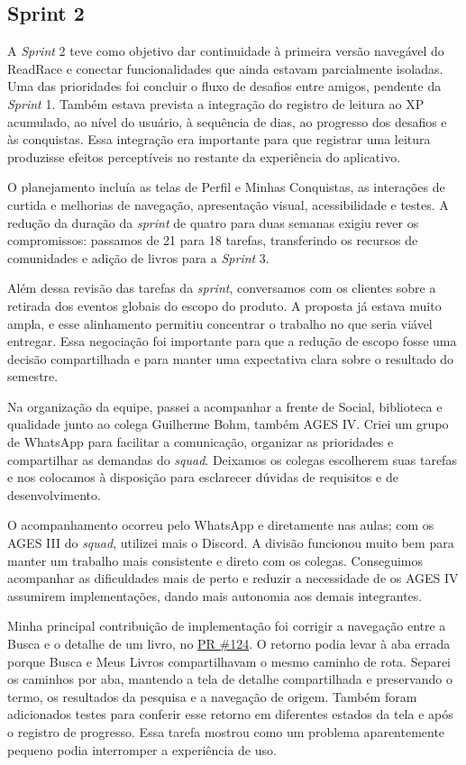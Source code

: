 \clearpage
\subsection{Sprint 2}

A \textit{Sprint} 2 teve como objetivo dar continuidade à primeira versão navegável do ReadRace e conectar funcionalidades que ainda estavam parcialmente isoladas. Uma das prioridades foi concluir o fluxo de desafios entre amigos, pendente da \textit{Sprint} 1. Também estava prevista a integração do registro de leitura ao \ac{XP} acumulado, ao nível do usuário, à sequência de dias, ao progresso dos desafios e às conquistas. Essa integração era importante para que registrar uma leitura produzisse efeitos perceptíveis no restante da experiência do aplicativo.

O planejamento incluía as telas de Perfil e Minhas Conquistas, as interações de curtida e melhorias de navegação, apresentação visual, acessibilidade e testes. A redução da duração da \textit{sprint} de quatro para duas semanas exigiu rever os compromissos: passamos de 21 para 18 tarefas, transferindo os recursos de comunidades e adição de livros para a \textit{Sprint} 3.

Além dessa revisão das tarefas da \textit{sprint}, conversamos com os clientes sobre a retirada dos eventos globais do escopo do produto. A proposta já estava muito ampla, e esse alinhamento permitiu concentrar o trabalho no que seria viável entregar. Essa negociação foi importante para que a redução de escopo fosse uma decisão compartilhada e para manter uma expectativa clara sobre o resultado do semestre.

Na organização da equipe, passei a acompanhar a frente de Social, biblioteca e qualidade junto ao colega Guilherme Bohm, também \ac{AGES} IV. Criei um grupo de WhatsApp para facilitar a comunicação, organizar as prioridades e compartilhar as demandas do \textit{squad}. Deixamos os colegas escolherem suas tarefas e nos colocamos à disposição para esclarecer dúvidas de requisitos e de desenvolvimento.

O acompanhamento ocorreu pelo WhatsApp e diretamente nas aulas; com os \ac{AGES} III do \textit{squad}, utilizei mais o Discord. A divisão funcionou muito bem para manter um trabalho mais consistente e direto com os colegas. Conseguimos acompanhar as dificuldades mais de perto e reduzir a necessidade de os \ac{AGES} IV assumirem implementações, dando mais autonomia aos demais integrantes.

Minha principal contribuição de implementação foi corrigir a navegação entre a Busca e o detalhe de um livro, no \href{https://github.com/ReadRace-AGES/ReadRace/pull/124}{PR \#124}. O retorno podia levar à aba errada porque Busca e Meus Livros compartilhavam o mesmo caminho de rota. Separei os caminhos por aba, mantendo a tela de detalhe compartilhada e preservando o termo, os resultados da pesquisa e a navegação de origem. Também foram adicionados testes para conferir esse retorno em diferentes estados da tela e após o registro de progresso. Essa tarefa mostrou como um problema aparentemente pequeno podia interromper a experiência de uso.

